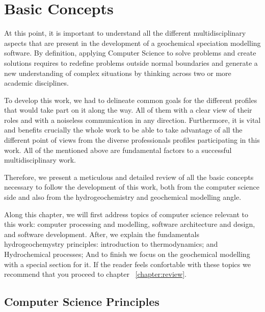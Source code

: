 \documentclass[ppgc,mestrado,english]{iiufrgs}
\begin{document}
\chapter{Basic Concepts}
\label{chapter:basic}

At this point, it is important to understand all the different multidisciplinary aspects that are present in the development of a geochemical speciation modelling software. By definition, applying Computer Science to solve problems and create solutions requires to redefine problems outside normal boundaries and generate a new understanding of complex situations by thinking across two or more academic disciplines. 

To develop this work, we had to delineate common goals for the different profiles that would take part on it along the way. All of them with a clear view of their roles and with a noiseless communication in any direction. Furthermore, it is vital and benefits crucially the whole work to be able to take advantage of all the different point of views from the diverse professionals profiles participating in this work. All of the mentioned above are fundamental factors to a successful multidisciplinary work.

Therefore, we present a meticulous and detailed review of all the basic concepts necessary to follow the development of this work, both from the computer science side and also from the hydrogeochemistry and geochemical modelling angle.

Along this chapter, we will first address topics of computer science relevant to this work: computer processing and modelling, software architecture and design, and software development. After, we explain the fundamentals hydrogeochemystry principles: introduction to thermodynamics; and Hydrochemical processes; And to finish we focus on the geochemical modelling with a special section for it. If the reader feels confortable with these topics we recommend that you proceed to chapter ~\ref{chapter:review}.


\section{Computer Science Principles}
\end{document}
